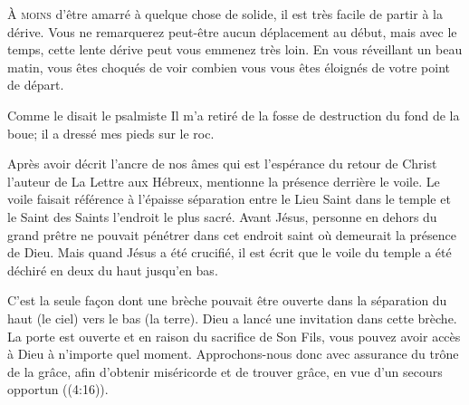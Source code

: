

\lettrine{À}{ moins} d'être amarré à quelque chose de solide,
 il est très facile de partir à la dérive.
 Vous ne remarquerez peut-être aucun déplacement au début,
 mais avec le temps, cette lente dérive peut vous emmenez très loin.
 En vous réveillant un beau matin, vous êtes choqués de voir
 combien vous vous êtes éloignés de votre point de départ. 

Comme le disait le psalmiste\frcolon {}
 \Og Il m'a retiré de la fosse de destruction du fond de la boue;
 il a dressé mes pieds sur le roc. \Fg{}


Après avoir décrit l'ancre de nos âmes
 \ocadr qui est l'espérance du retour de Christ \fcadr{}
 l'auteur de La Lettre aux Hébreux, mentionne la présence derrière le voile.
 Le voile faisait référence à l'épaisse séparation entre le Lieu Saint
 dans le temple et le Saint des Saints \ocadr l'endroit le plus sacré.
 Avant Jésus, personne en dehors du grand prêtre 
 ne pouvait pénétrer
 dans cet endroit saint où demeurait la présence de Dieu.
 Mais quand Jésus a été crucifié, il est écrit que le voile du temple
 a été déchiré en deux du haut jusqu'en bas.

C'est la seule fa\c{c}on dont une brèche pouvait être ouverte
 dans la séparation \ocadr du haut (le ciel) vers le bas (la terre).
 Dieu a lancé une invitation dans cette brèche. La porte est ouverte
 et en raison du sacrifice de Son Fils, vous pouvez avoir accès à Dieu
 à n'importe quel moment.
 \Og Approchons-nous donc avec assurance du trône de la grâce,
 afin d'obtenir miséricorde et de trouver grâce,
 en vue d'un secours opportun \Fg{} ((4:16)). 

\dvrule





